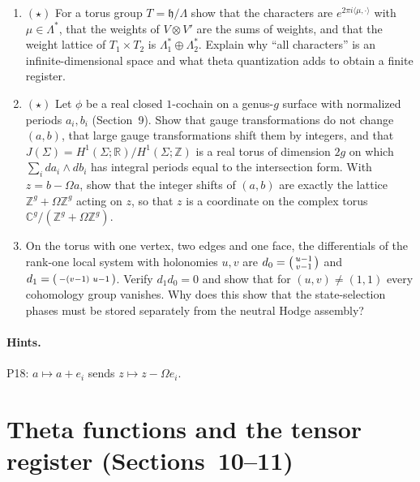 \documentclass[11pt]{article}
\newcommand{\Z}{\mathbb{Z}}
\newcommand{\R}{\mathbb{R}}
\newcommand{\C}{\mathbb{C}}
\begin{document}
\begin{enumerate}[label=\textbf{P\arabic*.},leftmargin=*,start=17]
\item $(\star)$ For a torus group $T = \mathfrak h/\Lambda$ show that the characters
  are $e^{2\pi i\langle\mu,\cdot\rangle}$ with $\mu\in\Lambda^*$, that the
  weights of $V\otimes V'$ are the sums of weights, and that the weight lattice
  of $T_1\times T_2$ is $\Lambda_1^*\oplus\Lambda_2^*$. Explain why ``all
  characters'' is an infinite-dimensional space and what theta quantization
  adds to obtain a finite register.
\item $(\star)$ Let $\phi$ be a real closed $1$-cochain on a genus-$g$ surface with
  normalized periods $a_i,b_i$ (Section~9). Show that gauge transformations
  do not change $(a,b)$, that large gauge transformations shift them by
  integers, and that $J(\Sigma) = H^1(\Sigma;\R)/H^1(\Sigma;\Z)$ is a real
  torus of dimension $2g$ on which $\sum_i da_i\wedge db_i$ has integral
  periods equal to the intersection form. With $z = b-\Omega a$, show that the
  integer shifts of $(a,b)$ are exactly the lattice $\Z^g+\Omega\Z^g$ acting on
  $z$, so that $z$ is a coordinate on the complex torus $\C^g/(\Z^g+\Omega\Z^g)$.
\item On the torus with one vertex, two edges and one face, the differentials of
  the rank-one local system with holonomies $u,v$ are
  $d_0 = \begin{psmallmatrix}u-1\\v-1\end{psmallmatrix}$ and
  $d_1 = \begin{psmallmatrix}-(v-1)&u-1\end{psmallmatrix}$. Verify $d_1d_0 = 0$
  and show that for $(u,v)\ne(1,1)$ every cohomology group vanishes. Why does
  this show that the state-selection phases must be stored separately from the
  neutral Hodge assembly?
\end{enumerate}

\paragraph{Hints.} P18: $a\mapsto a+e_i$ sends $z\mapsto z-\Omega e_i$.

\section{Theta functions and the tensor register (Sections~10--11)}
\end{document}
